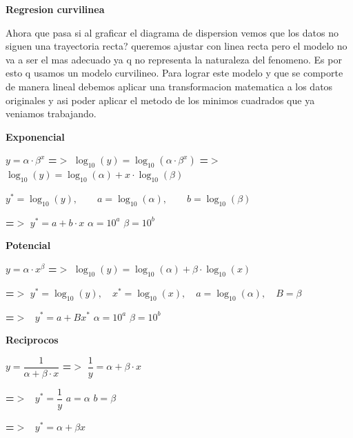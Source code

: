 \documentclass[12pt,a4paper]{article}
\begin{document}
{\fontsize{18}{22}\selectfont\bfseries Regresion curvilinea\par}

\hspace{16pt}\begin{minipage}{0.94\linewidth}
Ahora que pasa si al graficar el diagrama de dispersion vemos que los datos no siguen una trayectoria recta? queremos ajustar con linea recta pero el modelo no va a ser el mas adecuado ya q no representa la naturaleza del fenomeno. Es por esto q usamos un modelo curvilineo. Para lograr este modelo y que se comporte de manera lineal debemos aplicar una transformacion matematica a los datos originales y asi poder aplicar el metodo de los minimos cuadrados que ya veniamos trabajando.
\end{minipage}

\hspace{16pt}\textbf{Exponencial}

\begin{center}
$y = \alpha\cdot\beta^x$
\quad \textbf{=$>$} \quad
$\log_{10}(y) = \log_{10}(\alpha\cdot\beta^x)$
\quad \textbf{=$>$} \quad
$\log_{10}(y) = \log_{10}(\alpha) + x\cdot\log_{10}(\beta)$

\vspace{8pt}
$y^{*} = \log_{10}(y), \qquad a = \log_{10}(\alpha), \qquad b = \log_{10}(\beta)$

\vspace{8pt}
\textbf{=$>$} \quad $y^{*} = a + b\cdot x$
\hspace{1.6cm}
$\alpha = 10^a$ \hspace{1.0cm} $\beta = 10^b$
\end{center}

\hspace{16pt}\textbf{Potencial}

\begin{center}
$y = \alpha\cdot x^{\beta}$
\quad \textbf{=$>$} \quad
$\log_{10}(y) = \log_{10}(\alpha) + \beta\cdot\log_{10}(x)$

\vspace{8pt}
\textbf{=$>$} \quad $y^{*} = \log_{10}(y), \quad x^{*} = \log_{10}(x), \quad a = \log_{10}(\alpha), \quad B = \beta$

\vspace{8pt}
\textbf{=$>$} \ $y^{*} = a + Bx^{*}$
\hspace{2.2cm}
$\alpha = 10^a$ \hspace{1.0cm} $\beta = 10^b$
\end{center}

\hspace{16pt}\textbf{Reciprocos}

\begin{center}
$y = \dfrac{1}{\alpha+\beta\cdot x}$
\quad \textbf{=$>$} \quad
$\dfrac{1}{y} = \alpha + \beta\cdot x$

\vspace{10pt}
\textbf{=$>$} \ $y^{*} = \dfrac{1}{y}$
\hspace{1.2cm}
$a=\alpha$ \quad $b=\beta$

\vspace{10pt}
\textbf{=$>$} \ $y^{*} = \alpha + \beta x$
\end{center}
\end{document}
